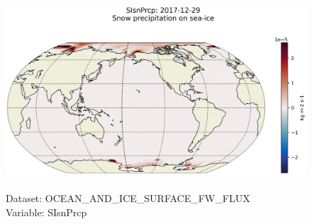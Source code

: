 \begin{figure}[H]
\centering
\includegraphics[scale=0.5]{../images/plots/latlon_plots/Ocean_and_Sea-Ice_Surface_Freshwater_Fluxes/SIsnPrcp.png}
\caption{\\Dataset: OCEAN\_AND\_ICE\_SURFACE\_FW\_FLUX\\Variable: SIsnPrcp}
\label{tab:table-OCEAN_AND_ICE_SURFACE_FW_FLUX_SIsnPrcp-Plot}
\end{figure}
\pagebreak
